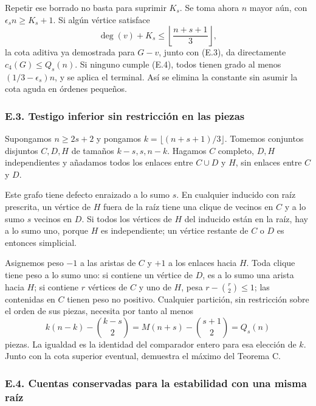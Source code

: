 \documentclass[spanish,11pt,a4paper]{article}
\begin{document}
Repetir ese borrado no basta para suprimir \(K_s\). Se toma ahora \(n\) mayor aún, con \(\epsilon_s n\ge K_s+1\). Si algún vértice satisface \[
\deg(v)+K_s\le\left\lfloor\frac{n+s+1}{3}\right\rfloor,
\tag{E.4}
\] la cota aditiva ya demostrada para \(G-v\), junto con (E.3), da directamente \(c_4(G)\le Q_s(n)\). Si ninguno cumple (E.4), todos tienen grado al menos \((1/3-\epsilon_s)n\), y se aplica el terminal. Así se elimina la constante sin asumir la cota aguda en órdenes pequeños.

\subsubsection{E.3. Testigo inferior sin restricción en las piezas}\label{e.3.-testigo-inferior-sin-restriccion-en-las-piezas}

Supongamos \(n\ge2s+2\) y pongamos \(k=\lfloor(n+s+1)/3\rfloor\). Tomemos conjuntos disjuntos \(C,D,H\) de tamaños \(k-s,s,n-k\). Hagamos \(C\) completo, \(D,H\) independientes y añadamos todos los enlaces entre \(C\cup D\) y \(H\), sin enlaces entre \(C\) y \(D\).

Este grafo tiene defecto enraizado a lo sumo \(s\). En cualquier inducido con raíz prescrita, un vértice de \(H\) fuera de la raíz tiene una clique de vecinos en \(C\) y a lo sumo \(s\) vecinos en \(D\). Si todos los vértices de \(H\) del inducido están en la raíz, hay a lo sumo uno, porque \(H\) es independiente; un vértice restante de \(C\) o \(D\) es entonces simplicial.

Asignemos peso \(-1\) a las aristas de \(C\) y \(+1\) a los enlaces hacia \(H\). Toda clique tiene peso a lo sumo uno: si contiene un vértice de \(D\), es a lo sumo una arista hacia \(H\); si contiene \(r\) vértices de \(C\) y uno de \(H\), pesa \(r-\binom r2\le1\); las contenidas en \(C\) tienen peso no positivo. Cualquier partición, sin restricción sobre el orden de sus piezas, necesita por tanto al menos \[
k(n-k)-\binom{k-s}{2}
=M(n+s)-\binom{s+1}{2}=Q_s(n)
\tag{E.5}
\] piezas. La igualdad es la identidad del comparador entero para esa elección de \(k\). Junto con la cota superior eventual, demuestra el máximo del Teorema C.

\subsubsection{E.4. Cuentas conservadas para la estabilidad con una misma raíz}\label{e.4.-cuentas-conservadas-para-la-estabilidad-con-una-misma-raiz}
\end{document}
